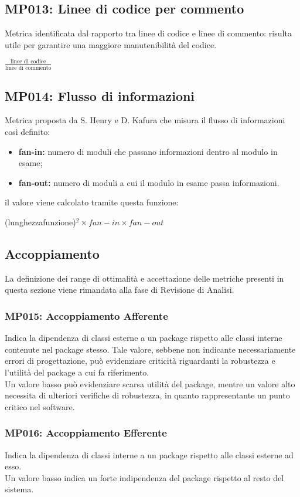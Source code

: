 \subsection{MP013: Linee di codice per commento}
Metrica identificata dal rapporto tra linee di codice e linee di commento: risulta utile per garantire una maggiore manutenibilità del codice.
\begin{center}
$\frac{\mbox{linee di codice}}{\mbox{linee di commento}}$
\end{center}
\subsection{MP014: Flusso di informazioni}
Metrica proposta da S. Henry e D. Kafura che misura il flusso di informazioni così definito:

\begin{itemize}
	\item \textbf{fan-in:} numero di moduli che passano informazioni dentro al modulo in esame;
	\item \textbf{fan-out:} numero di moduli a cui il modulo in esame passa informazioni.
\end{itemize} 
il valore viene calcolato tramite questa funzione:
\begin{center}
	(lunghezzafunzione)$^2\times fan-in\times fan-out$
\end{center}

\subsection{Accoppiamento}
La definizione dei range di ottimalità e accettazione delle metriche presenti in questa sezione viene rimandata alla fase di Revisione di Analisi.
\subsubsection{MP015: Accoppiamento Afferente}
Indica la dipendenza di classi esterne a un package rispetto alle classi interne contenute nel package stesso.
Tale valore, sebbene non indicante necessariamente errori di progettazione, può evidenziare criticità riguardanti la robustezza e l'utilità del package a cui fa riferimento.\\
Un valore basso può evidenziare scarsa utilità del package, mentre un valore alto necessita di ulteriori verifiche di robustezza, in quanto rappresentante un punto critico nel software.
\subsubsection{MP016: Accoppiamento Efferente}
Indica la dipendenza di classi interne a un package rispetto alle classi esterne ad esso.\\
Un valore basso indica un forte indipendenza del package rispetto al resto del sistema.


